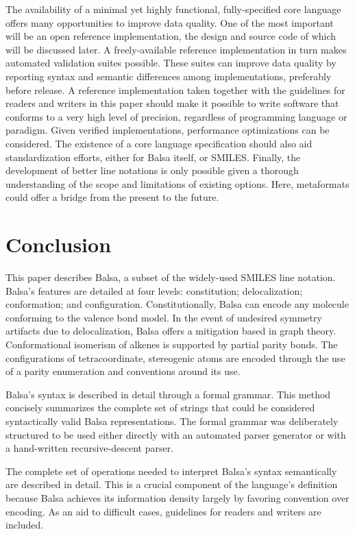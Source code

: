 \documentclass{article}
\begin{document}
The availability of a minimal yet highly functional, fully-specified core language offers many opportunities to improve data quality. One of the most important will be an open reference implementation, the design and source code of which will be discussed later. A freely-available reference implementation in turn makes automated validation suites possible. These suites can improve data quality by reporting syntax and semantic differences among implementations, preferably before release. A reference implementation taken together with the guidelines for readers and writers in this paper should make it possible to write software that conforms to a very high level of precision, regardless of programming language or paradigm. Given verified implementations, performance optimizations can be considered. The existence of a core language specification should also aid standardization efforts, either for Balsa itself, or SMILES. Finally, the development of better line notations is only possible given a thorough understanding of the scope and limitations of existing options. Here, metaformats could offer a bridge from the present to the future.

\section*{Conclusion}

This paper describes Balsa, a subset of the widely-\-used SMILES line notation. Balsa's features are detailed at four levels: constitution; delocalization; conformation; and configuration. Constitutionally, Balsa can encode any molecule conforming to the valence bond model. In the event of undesired symmetry artifacts due to delocalization, Balsa offers a mitigation based in graph theory. Conformational isomerism of alkenes is supported by partial parity bonds. The configurations of tetracoordinate, stereogenic atoms are encoded through the use of a parity enumeration and conventions around its use.

Balsa's syntax is described in detail through a formal grammar. This method concisely summarizes the complete set of strings that could be considered syntactically valid Balsa representations. The formal grammar was deliberately structured to be used either directly with an automated parser generator or with a hand-written recursive-descent parser.

The complete set of operations needed to interpret Balsa's syntax semantically are described in detail. This is a crucial component of the language's definition because Balsa achieves its information density largely by favoring convention over encoding. As an aid to difficult cases, guidelines for readers and writers are included.
\end{document}
